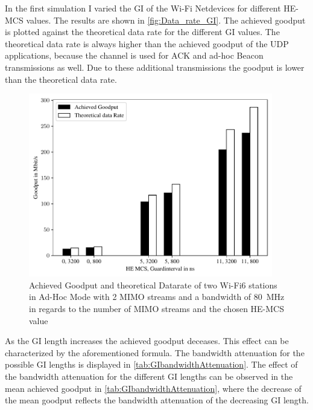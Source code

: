In the first simulation I varied the \ac{GI} of the Wi-Fi Netdevices for different HE-\ac{MCS} values.
The results are shown in \autoref{fig:Data_rate_GI}. The achieved goodput is plotted against the theoretical data rate for the different \ac{GI} values.
The theoretical data rate is always higher than the achieved goodput of the UDP applications, because the channel is used for \ac{ACK} and ad-hoc Beacon transmissions as well. Due to
these additional transmissions the goodput is lower than the theoretical data rate.
\begin{figure}[H]
	\centering
	\includegraphics[width=0.95\textwidth]{figures/gi_dataRate_simulation.pdf}
	\caption{Achieved Goodput and theoretical Datarate of two Wi-Fi6 stations in Ad-Hoc Mode with \num{2} \acf{MIMO} streams and a bandwidth of \SI{80}{\mega\hertz} in regards to the number of \acf{MIMO} streams and the chosen HE-\acf{MCS} value}%
	\label{fig:Data_rate_GI}%
\end{figure}

As the \ac{GI} length increases the achieved goodput deceases.
This effect can be characterized by the aforementioned formula.
The bandwidth attenuation for the possible \ac{GI} lengths is displayed in \autoref{tab:GIbandwidthAttenuation}.
The effect of the bandwidth attenuation for the different \ac{GI} lengths can be observed in the mean achieved goodput in
\autoref{tab:GIbandwidthAttenuation}, where the decrease of the mean goodput reflects the bandwidth attenuation of the decreasing \ac{GI} length.


